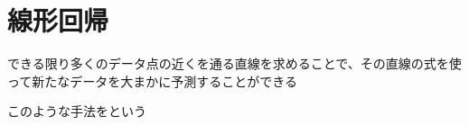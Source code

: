 \documentclass[../../../topic_machine-learning]{subfiles}
\begin{document}
\sectionline
\section{線形回帰}

できる限り多くのデータ点の近くを通る直線を求めることで、その直線の式を使って新たなデータを大まかに予測することができる

このような手法をという
\end{document}
